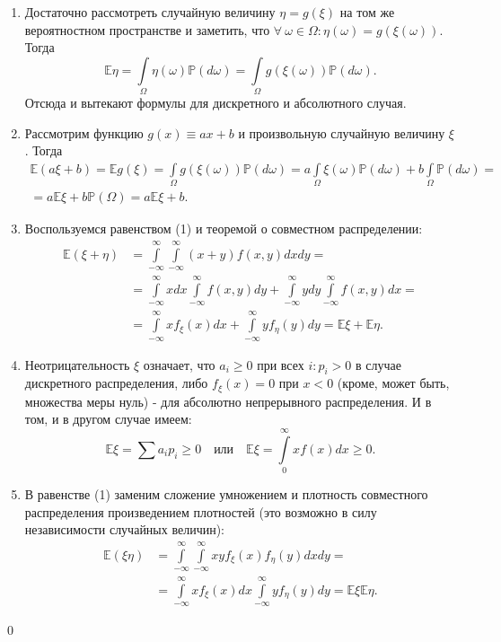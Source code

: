 \documentclass[oneside,final,14pt]{extreport}
\newcommand\myprob[1]{{\mathbb{P}(#1)}}
\renewenvironment{proof}{{\bfseries Доказательство.}}{\qed}
\theoremstyle{plain}
\theoremstyle{definition}
\theoremstyle{named}
\begin{document}
\begin{proof}
\begin{enumerate}
    \item Достаточно рассмотреть случайную величину $\eta = g(\xi)$ на том же вероятностном пространстве и заметить, что $\forall \: \omega \in \Omega \colon \eta(\omega) = g(\xi(\omega))$. Тогда 
    $$ \mathbb{E}\eta = \int\limits_{\Omega} \eta(\omega) \mathbb{P}(d\omega) = \int\limits_{\Omega} g(\xi(\omega)) \mathbb{P}(d\omega). $$
    Отсюда и вытекают формулы для дискретного и абсолютного случая.
    
    \item Рассмотрим функцию $g(x) \equiv ax + b$ и произвольную случайную величину $\xi$. Тогда 
    \begin{multline*}
        \mathbb{E}(a \xi + b) 
        = \mathbb{E}g(\xi) 
        = \int\limits_{\Omega}g(\xi(\omega))\mathbb{P}(d\omega)
        = a \int\limits_{\Omega}\xi(\omega)\mathbb{P}(d\omega) + b \int\limits_{\Omega}\mathbb{P}(d\omega) = \\
        = a \mathbb{E}\xi + b \myprob{\Omega} = a \mathbb{E}\xi + b.
    \end{multline*}
    
    \item Воспользуемся равенством (1) и теоремой о совместном распределении:
        $$\begin{aligned}
        \mathbb{E}(\xi+\eta) &=\int\limits_{-\infty}^{\infty} \int\limits_{-\infty}^{\infty}(x+y) f(x, y) d x d y=\\
        &=\int\limits_{-\infty}^{\infty} x d x \int\limits_{-\infty}^{\infty} f(x, y) d y+\int\limits_{-\infty}^{\infty} y d y \int\limits_{-\infty}^{\infty} f(x, y) d x=\\
        &=\int\limits_{-\infty}^{\infty} x f_{\xi}(x) d x+\int\limits_{-\infty}^{\infty} y f_{\eta}(y) d y=\mathbb{E} \xi+\mathbb{E} \eta.
        \end{aligned}$$
    \item Неотрицательность $\xi$ означает, что $a_i \geqslant 0$ при всех $i \colon p_i > 0$ в случае дискретного распределения, либо $f_\xi(x) = 0$ при $x < 0$ (кроме, может быть, множества меры нуль) - для абсолютно непрерывного распределения. И в том, и в другом случае имеем:
        $$\mathbb{E} \xi=\sum a_{i} p_{i} \geqslant 0 \quad \text {или} \quad \mathbb{E} \xi=\int\limits_{0}^{\infty} x f(x) d x \geqslant 0.$$
        
    \item В равенстве (1) заменим сложение умножением и плотность совместного распределения произведением плотностей (это возможно в силу независимости случайных величин):
        $$\begin{aligned}
        \mathbb{E}(\xi \eta) &=\int\limits_{-\infty}^{\infty} \int\limits_{-\infty}^{\infty} x y f_{\xi}(x) f_{\eta}(y) d x d y=\\
        &=\int\limits_{-\infty}^{\infty} x f_{\xi}(x) d x \int\limits_{-\infty}^{\infty} y f_{\eta}(y) d y=\mathbb{E} \xi \mathbb{E} \eta.
        \end{aligned}$$
        

\end{enumerate}
\end{proof}
\end{document}
